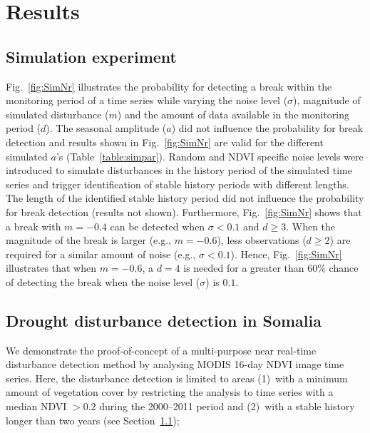 \documentclass[authoryear,preprint,review,10pt]{elsarticle}
\begin{document}
\section{Results}

\subsection{Simulation experiment} \label{sec:DiscSim}

Fig.~\ref{fig:SimNr} illustrates the probability for detecting a break within the monitoring period of a time series while varying the noise level ($\sigma$), magnitude of simulated disturbance ($m$) and the amount of data available in the monitoring period ($d$). The seasonal amplitude ($a$) did not influence the probability for break detection and results shown in Fig.~\ref{fig:SimNr}  are valid for the different simulated $a$'s (Table~\ref{table:simpar}). 
Random and NDVI specific noise levels were introduced to simulate disturbances in the history period of the simulated time series and trigger identification of stable history periods with different lengths. The length of the identified stable history period did not influence the probability for break detection (results not shown). Furthermore, Fig.~\ref{fig:SimNr} shows that a break with $m = -0.4$ can be detected when $\sigma < 0.1$ and $d  \geq 3$.  When the magnitude of the break is larger (e.g., $m = -0.6$), less observations ($d \geq 2$) are required for a similar amount of noise (e.g., $\sigma < 0.1$). Hence, Fig.~\ref{fig:SimNr} illustrates that when $m = -0.6$, a $d=4$ is needed for a greater than $60\%$ chance of detecting the break when the noise level ($\sigma$) is $0.1$.



\subsection{Drought disturbance detection in Somalia} \label{sec:DiscReal}

We demonstrate the proof-of-concept of a multi-purpose near real-time disturbance detection method by analysing MODIS 16-day NDVI image time series. Here, the disturbance detection is limited to areas (1)~with a minimum amount of vegetation cover by restricting the analysis to time series with a median NDVI $>0.2$ during the 2000--2011 period \citep{Vrieling:2011da} and (2)~with a stable history longer than two years (see Section~\ref{sec:DiscSim});
\end{document}
